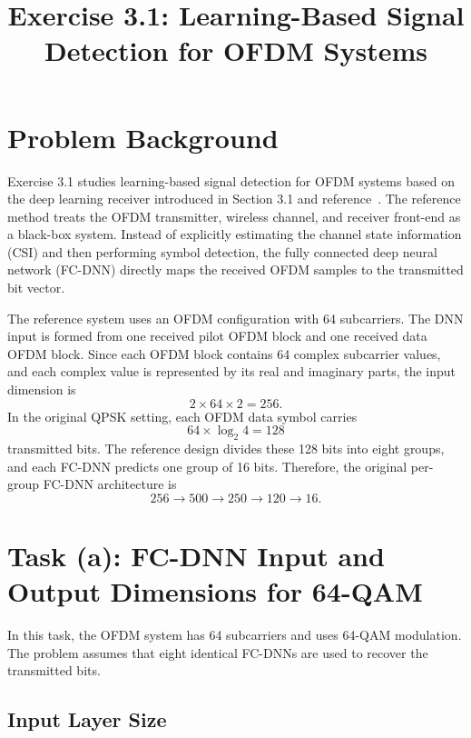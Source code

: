 \documentclass[11pt,a4paper]{article}
\title{Exercise 3.1: Learning-Based Signal Detection for OFDM Systems}
\author{}
\date{}
\begin{document}
\maketitle

\section{Problem Background}

Exercise 3.1 studies learning-based signal detection for OFDM systems based on the deep learning receiver introduced in Section 3.1 and reference~\cite{ye2017power}. The reference method treats the OFDM transmitter, wireless channel, and receiver front-end as a black-box system. Instead of explicitly estimating the channel state information (CSI) and then performing symbol detection, the fully connected deep neural network (FC-DNN) directly maps the received OFDM samples to the transmitted bit vector.

The reference system uses an OFDM configuration with 64 subcarriers. The DNN input is formed from one received pilot OFDM block and one received data OFDM block. Since each OFDM block contains 64 complex subcarrier values, and each complex value is represented by its real and imaginary parts, the input dimension is
\begin{equation}
    2 \times 64 \times 2 = 256 .
\end{equation}
In the original QPSK setting, each OFDM data symbol carries
\begin{equation}
    64 \times \log_2 4 = 128
\end{equation}
transmitted bits. The reference design divides these 128 bits into eight groups, and each FC-DNN predicts one group of 16 bits. Therefore, the original per-group FC-DNN architecture is
\begin{equation}
    256 \rightarrow 500 \rightarrow 250 \rightarrow 120 \rightarrow 16 .
\end{equation}

\section{Task (a): FC-DNN Input and Output Dimensions for 64-QAM}

In this task, the OFDM system has 64 subcarriers and uses 64-QAM modulation. The problem assumes that eight identical FC-DNNs are used to recover the transmitted bits.

\subsection{Input Layer Size}
\end{document}
